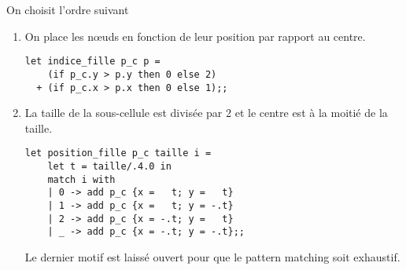 \begin{Exercise}[title=Indices]

On choisit l'ordre suivant
\hskip 3cm

\newpage

\renewcommand{\labelenumi}{\alph{enumi})}
\begin{enumerate}
   \itemsep6mm 
    \item On place les nœuds en fonction de leur position par rapport au centre.
\begin{lstlisting}
let indice_fille p_c p =
    (if p_c.y > p.y then 0 else 2) 
  + (if p_c.x > p.x then 0 else 1);;
\end{lstlisting}
    \item La taille de la sous-cellule est divisée par 2 et le centre est à la moitié de la taille.
\begin{lstlisting}
let position_fille p_c taille i =
    let t = taille/.4.0 in
    match i with
    | 0 -> add p_c {x =   t; y =   t}
    | 1 -> add p_c {x =   t; y = -.t}
    | 2 -> add p_c {x = -.t; y =   t}
    | _ -> add p_c {x = -.t; y = -.t};;
\end{lstlisting}
Le dernier motif est laissé ouvert pour que le pattern matching soit exhaustif.
\end{enumerate}
\end{Exercise}
